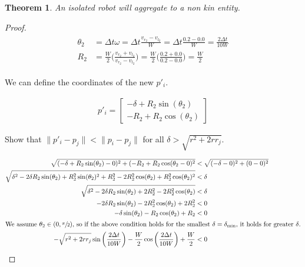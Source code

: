 \documentclass[conference]{IEEEtran}
\newtheorem{theorem}{Theorem}
\begin{document}
  \begin{theorem} \label{thm:aggregation_with_non_kin}
    An isolated robot will aggregate to a non kin entity.
  \end{theorem}
  \begin{proof}
    \begin{align}
      \begin{split} \label{eq:non_kin_theta_and_r}
        \theta_2 &= \Delta t\omega = \Delta t \frac{v_{r_2} - v_{l_2}}{W} = \Delta t \frac{0.2 - 0.0}{W} = \frac{2\Delta t}{10W} \\
        R_2 &= \frac{W}{2}\bigg(\frac{v_{r_2} + v_{l_2}}{v_{r_2} - v_{l_2}}\bigg) = \frac{W}{2}\bigg(\frac{0.2 + 0.0}{0.2 - 0.0}\bigg) = \frac{W}{2}
      \end{split}
    \end{align}

    We can define the coordinates of the new $p'_i$.

    \begin{align} \label{eq:non_kin_coordinates}
      p'_i = \begin{bmatrix}-\delta+R_2\sin(\theta_2) \\ -R_2+R_2\cos(\theta_2)\end{bmatrix}
    \end{align}

    Show that $\lVert p'_i - p_j\rVert < \lVert p_i - p_j\rVert$ for all $\delta > \sqrt{r^2+2rr_j}$.

    \begin{align*}
      \sqrt{(-\delta+R_2\sin(\theta_2)-0)^2 + (-R_2+R_2\cos(\theta_2-0)^2} &< \sqrt{(-\delta-0)^2 + (0-0)^2} \\
      \sqrt{\delta^2-2\delta R_2\sin(\theta_2) + R_2^2\sin(\theta_2)^2 + R_2^2-2R_2^2\cos(\theta_2)+R_2^2\cos(\theta_2)^2} &< \delta \\
      \sqrt{\delta^2-2\delta R_2\sin(\theta_2) + 2R_2^2-2R_2^2\cos(\theta_2)} &< \delta \\
      -2\delta R_2\sin(\theta_2) - 2R_2^2\cos(\theta_2) + 2R_2^2 &< 0 \\
      -\delta \sin(\theta_2) - R_2\cos(\theta_2) + R_2 &< 0 \\
      \intertext{We assume $\theta_2\in(0,\sfrac{\pi}{2})$, so if the above condition holds for the smallest $\delta=\delta_{\text{min}}$, it holds for greater $\delta$.}
      -\sqrt{r^2+2rr_j}\sin\bigg(\frac{2\Delta t}{10W}\bigg) - \frac{W}{2}\cos\bigg(\frac{2\Delta t}{10W}\bigg) + \frac{W}{2} &< 0
    \end{align*}
  \end{proof}
\end{document}
